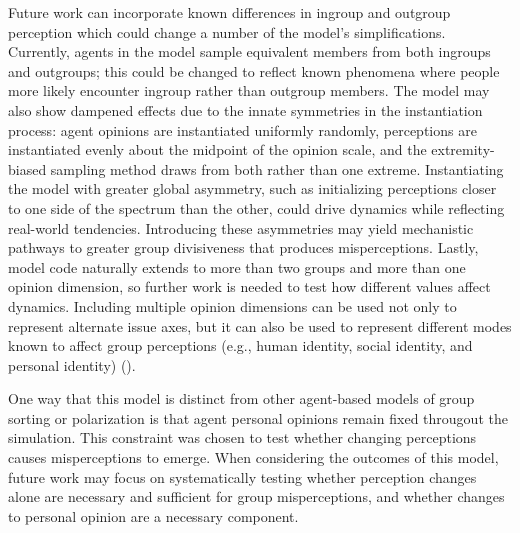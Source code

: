 Future work can incorporate known differences in ingroup and outgroup perception which could change a number of the model's simplifications. 
Currently, agents in the model sample equivalent members from both ingroups and outgroups; this could be changed to reflect known phenomena where people more likely encounter ingroup rather than outgroup members. 
The model may also show dampened effects due to the innate symmetries in the instantiation process: agent opinions are instantiated uniformly randomly, perceptions are instantiated evenly about the midpoint of the opinion scale, and the extremity-biased sampling method draws from both rather than one extreme. 
Instantiating the model with greater global asymmetry, such as initializing perceptions closer to one side of the spectrum than the other, could drive dynamics while reflecting real-world tendencies. 
Introducing these asymmetries may yield mechanistic pathways to greater group divisiveness that produces misperceptions. 
Lastly, model code naturally extends to more than two groups and more than one opinion dimension, so further work is needed to test how different values affect dynamics. 
Including multiple opinion dimensions can be used not only to represent alternate issue axes, but it can also be used to represent different modes known to affect group perceptions (e.g., human identity, social identity, and personal identity) (\cite{hornsey_social_2008}). 

One way that this model is distinct from other agent-based models of group sorting or polarization is that agent personal opinions remain fixed througout the simulation. 
This constraint was chosen to test whether changing perceptions causes misperceptions to emerge. 
When considering the outcomes of this model, future work may focus on systematically testing whether perception changes alone are necessary and sufficient for group misperceptions, and whether changes to personal opinion are a necessary component. 
